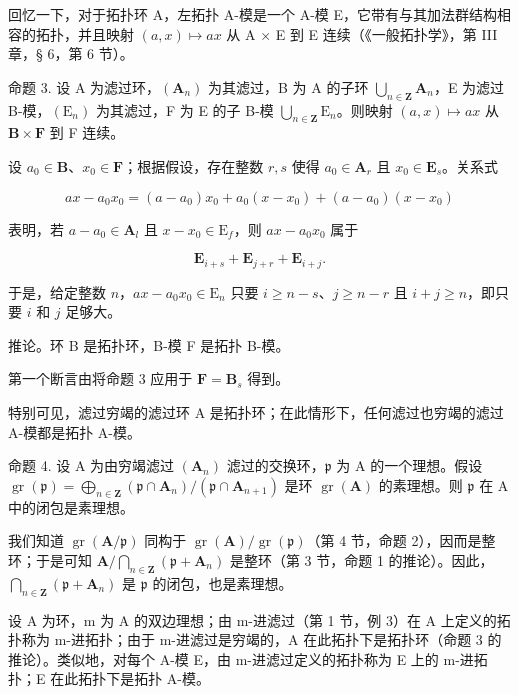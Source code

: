 回忆一下，对于拓扑环 A，左拓扑 A-模是一个 A-模 E，它带有与其加法群结构相容的拓扑，并且映射 \((a, x) \mapsto ax\) 从 A × E 到 E 连续（《一般拓扑学》，第 III 章，§ 6，第 6 节）。

命题 3. 设 A 为滤过环，\((\mathbf{A}_n)\) 为其滤过，B 为 A 的子环 \(\bigcup_{n\in \mathbf{Z}}\mathbf{A}_n\)，E 为滤过 B-模，\((\mathrm{E}_n)\) 为其滤过，F 为 E 的子 B-模 \(\bigcup_{n\in \mathbf{Z}}\mathrm{E}_n\)。则映射 \((a,x)\mapsto ax\) 从 \(\mathbf{B}\times \mathbf{F}\) 到 F 连续。

	设 \(a_0 \in \mathbf{B}\)、\(x_0 \in \mathbf{F}\)；根据假设，存在整数 \(r, s\) 使得 \(a_0 \in \mathbf{A}_r\) 且 \(x_0 \in \mathbf{E}_s\)。关系式

\[
a x - a _ {0} x _ {0} = (a - a _ {0}) x _ {0} + a _ {0} (x - x _ {0}) + (a - a _ {0}) (x - x _ {0})
\]

表明，若 \(a - a_0 \in \mathbf{A}_l\) 且 \(x - x_0 \in \mathrm{E}_f\)，则 \(ax - a_0x_0\) 属于

\[
\mathbf {E} _ {i + s} + \mathbf {E} _ {j + r} + \mathbf {E} _ {i + j}.
\]

	于是，给定整数 \(n\)，\(ax - a_0x_0 \in \mathrm{E}_n\) 只要 \(i \geqslant n - s\)、\(j \geqslant n - r\) 且 \(i + j \geqslant n\)，即只要 \(i\) 和 \(j\) 足够大。

推论。环 B 是拓扑环，B-模 F 是拓扑 B-模。

第一个断言由将命题 3 应用于 \(\mathbf{F} = \mathbf{B}_s\) 得到。

特别可见，滤过穷竭的滤过环 A 是拓扑环；在此情形下，任何滤过也穷竭的滤过 A-模都是拓扑 A-模。

	命题 4. 设 A 为由穷竭滤过 \((\mathbf{A}_n)\) 滤过的交换环，\(\mathfrak{p}\) 为 A 的一个理想。假设 \(\operatorname{gr}(\mathfrak{p}) = \bigoplus_{n \in \mathbf{Z}} (\mathfrak{p} \cap \mathbf{A}_n) / (\mathfrak{p} \cap \mathbf{A}_{n+1})\) 是环 \(\operatorname{gr}(\mathbf{A})\) 的素理想。则 \(\mathfrak{p}\) 在 A 中的闭包是素理想。

	我们知道 \(\operatorname{gr}(\mathbf{A} / \mathfrak{p})\) 同构于 \(\operatorname{gr}(\mathbf{A}) / \operatorname{gr}(\mathfrak{p})\)（第 4 节，命题 2），因而是整环；于是可知 \(\mathbf{A} / \bigcap_{n\in \mathbf{Z}}(\mathfrak{p} + \mathbf{A}_n)\) 是整环（第 3 节，命题 1 的推论）。因此，\(\bigcap_{n\in \mathbf{Z}}(\mathfrak{p} + \mathbf{A}_n)\) 是 \(\mathfrak{p}\) 的闭包，也是素理想。

设 A 为环，m 为 A 的双边理想；由 m-进滤过（第 1 节，例 3）在 A 上定义的拓扑称为 m-进拓扑；由于 m-进滤过是穷竭的，A 在此拓扑下是拓扑环（命题 3 的推论）。类似地，对每个 A-模 E，由 m-进滤过定义的拓扑称为 E 上的 m-进拓扑；E 在此拓扑下是拓扑 A-模。

